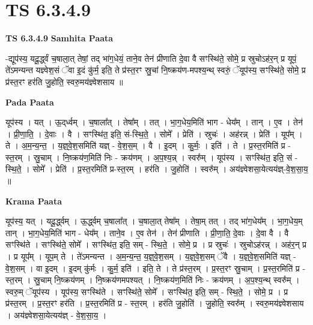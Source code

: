 \documentclass[17pt]{extarticle}
\begin{document}
\section{ TS 6.3.4.9 }

\textbf{TS 6.3.4.9 } \newline
\textbf{Samhita Paata} \newline

-द्यूप॑स्य॒ यदू॒र्द्ध्वं च॒षाला॒त् तेषां॒ तद् भा॑ग॒धेयं॒ ताने॒व तेन॑ प्रीणाति दे॒वा वै सꣳस्थि॑ते॒ सोमे॒ प्र स्रुचोऽह॑र॒न् प्र यूपं॒ ते॑ऽमन्यन्त यज्ञ्वेश॒सं ॅवा इ॒दं कु॑र्म॒ इति॒ ते प्र॑स्त॒रꣳ स्रु॒चां नि॒ष्क्रय॑ण-मपश्य॒न्थ् स्वरुं॒ ॅयूप॑स्य॒ सꣳस्थि॑ते॒ सोमे॒ प्र प्र॑स्त॒रꣳ हर॑ति जु॒होति॒ स्वरु॒मय॑ज्ञ्वेशसाय ॥ \newline

\textbf{Pada Paata} \newline

यूप॑स्य । यत् । ऊ॒द्‌र्ध्वम् । च॒षाला᳚त् । तेषा᳚म् । तत् । भा॒ग॒धेय॒मिति॑ भाग - धेय᳚म् । तान् । ए॒व । तेन॑ । प्री॒णा॒ति॒ । दे॒वाः । वै । सꣳस्थि॑त॒ इति॒ सं-स्थि॒ते॒ । सोमे᳚ । प्रेति॑ । स्रुचः॑ । अह॑रन्न् । प्रेति॑ । यूप᳚म् । ते । अ॒म॒न्य॒न्त॒ । य॒ज्ञ्॒वे॒श॒समिति॑ यज्ञ् - वे॒श॒स॒म् । वै । इ॒दम् । कु॒र्मः॒ । इति॑ । ते । प्र॒स्त॒रमिति॑ प्र - स्त॒रम् । स्रु॒चाम् । नि॒ष्क्रय॑ण॒मिति॑ निः - क्रय॑णम् । अ॒प॒श्य॒न्न् । स्वरु᳚म् । यूप॑स्य । सꣳस्थि॑त॒ इति॒ सं - स्थि॒ते॒ । सोमे᳚ । प्रेति॑ । प्र॒स्त॒रमिति॑ प्र-स्त॒रम् । हर॑ति । जु॒होति॑ । स्वरु᳚म् । अय॑ज्ञ्वेशसा॒येत्यय॑ज्ञ्-वे॒श॒सा॒य॒ ॥  \newline


\textbf{Krama Paata} \newline

यूप॑स्य॒ यत् । यदू॒र्द्ध्वम् । ऊ॒र्द्ध्वम् च॒षाला᳚त् । च॒षाला॒त् तेषा᳚म् । तेषा॒म् तत् । तद् भा॑ग॒धेय᳚म् । भा॒ग॒धेय॒म् तान् । भा॒ग॒धेय॒मिति॑ भाग - धेय᳚म् । ताने॒व । ए॒व तेन॑ । तेन॑ प्रीणाति । प्री॒णा॒ति॒ दे॒वाः । दे॒वा वै । वै सꣳस्थि॑ते । सꣳस्थि॑ते॒ सोमे᳚ । सꣳस्थि॑त॒ इति॒ सम् - स्थि॒ते॒ । सोमे॒ प्र । प्र स्रुचः॑ । स्रुचोऽह॑रन्न् । अह॑र॒न् प्र । प्र यूप᳚म् । यूप॒म् ते । ते॑ऽमन्यन्त । अ॒म॒न्य॒न्त॒ य॒ज्ञ्॒वे॒श॒सम् । य॒ज्ञ्॒वे॒श॒सम् ॅवै । य॒ज्ञ्॒वे॒श॒समिति॑ यज्ञ् - वे॒श॒सम् । वा इ॒दम् । इ॒दम् कु॑र्मः । कु॒र्म॒ इति॑ । इति॒ ते । ते प्र॑स्त॒रम् । प्र॒स्त॒रꣳ स्रु॒चाम् । प्र॒स्त॒रमिति॑ प्र - स्त॒रम् । स्रु॒चाम् नि॒ष्क्रय॑णम् । नि॒ष्क्रय॑णमपश्यत् । नि॒ष्क्रय॑ण॒मिति॑ निः - क्रय॑णम् । अ॒प॒श्य॒न्थ् स्वरु᳚म् । स्वरु॒म् ॅयूप॑स्य । यूप॑स्य॒ सꣳस्थि॑ते । सꣳस्थि॑ते॒ सोमे᳚ । सꣳस्थि॑त॒ इति॒ सम् - स्थि॒ते॒ । सोमे॒ प्र । प्र प्र॑स्त॒रम् । प्र॒स्त॒रꣳ हर॑ति । प्र॒स्त॒रमिति॑ प्र - स्त॒रम् । हर॑ति जु॒होति॑ । जु॒होति॒ स्वरु᳚म् । स्वरु॒मय॑ज्ञ्वेशसाय । अय॑ज्ञ्वेशसा॒येत्यय॑ज्ञ् - वे॒श॒सा॒य॒ । \newline
\end{document}
